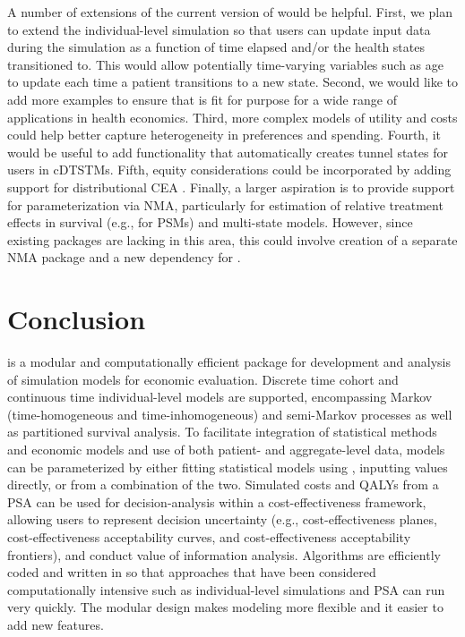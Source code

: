 \documentclass[article, nojss]{jss}\usepackage[]{graphicx}\usepackage[]{color}
\begin{document}
A number of extensions of the current version of  would be helpful. First, we plan to extend the individual-level simulation so that users can update input data during the simulation as a function of time elapsed and/or the health states transitioned to. This would allow potentially time-varying variables such as age to update each time a patient transitions to a new state. Second, we would like to add more examples to ensure that  is fit for purpose for a wide range of applications in health economics. Third, more complex models of utility \citep{kharroubi2007modelling, hernandez2013relationship} and costs \citep{nixon2005methods} could help better capture heterogeneity in preferences and spending. Fourth, it would be useful to add functionality that automatically creates tunnel states for users in cDTSTMs. Fifth, equity considerations could be incorporated by adding support for distributional CEA \citep{asaria2015distributional, asaria2016distributional, cookson2017using}. Finally, a larger aspiration is to provide support for parameterization via NMA, particularly for estimation of relative treatment effects in survival (e.g., for PSMs) and multi-state models. However, since existing  packages are lacking in this area, this could involve creation of a separate NMA package and a new dependency for . 

\section{Conclusion} \label{sec:conclusion}
 is a modular and computationally efficient  package for development and analysis of simulation models for economic evaluation. Discrete time cohort and continuous time individual-level models are supported, encompassing Markov (time-homogeneous and time-inhomogeneous) and semi-Markov processes as well as partitioned survival analysis. To facilitate integration of statistical methods and economic models and use of both patient- and aggregate-level data, models can be parameterized by either fitting statistical models using , inputting values directly, or from a combination of the two. Simulated costs and QALYs from a PSA can be used for decision-analysis within a cost-effectiveness framework, allowing users to represent decision uncertainty (e.g., cost-effectiveness planes, cost-effectiveness acceptability curves, and cost-effectiveness acceptability frontiers), and conduct value of information analysis. Algorithms are efficiently coded and written in  so that approaches that have been considered computationally intensive such as individual-level simulations and PSA can run very quickly. The modular design makes modeling more flexible and it easier to add new features. 
\end{document}
